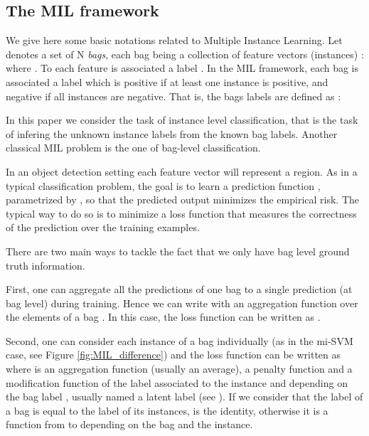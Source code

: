 \documentclass[preprint]{elsarticle}
\begin{document}
\subsection{The MIL framework}

We give here some basic notations related to Multiple Instance Learning. 
Let  denotes a set of N {\it bags}, each bag  being a collection of feature vectors (instances) :  where . To each feature  is associated a label . In the MIL framework, each bag is associated a label which is positive if at least one instance is positive, and negative if all instances are negative. That is, the bags labels  are defined as :

In this paper we consider the task of instance level classification, that is the task of infering the unknown instance labels  from the known bag labels. Another classical MIL problem is the one of bag-level classification. 

 In an object detection setting each feature vector will represent a region. As in a typical classification problem, the goal is to learn a prediction function , parametrized by , so that the predicted output  minimizes the empirical risk.
The typical way to do so is to minimize a loss function that measures the correctness of the prediction over the training examples. 


There are two main ways to tackle the fact that we only have bag level ground truth information.

First, one can aggregate all the predictions of one bag to a single prediction (at bag level) during training.
Hence we can write  with  an aggregation function over the elements of a bag . In this case, the loss function can be written as .


Second, one can consider each instance of a bag individually (as in the mi-SVM case, see Figure \ref{fig:MIL_difference}) and the loss function can be written as  where  is an aggregation function (usually an average),  a penalty function and  a modification function of the label associated to the instance   and depending on the bag label , usually named a latent label (see \citep{felzenszwalb_object_2010}). If we consider that the label of a bag is equal to the label of its instances,  is the identity, otherwise it is a function from  to  depending on the bag and the instance. 
\end{document}
